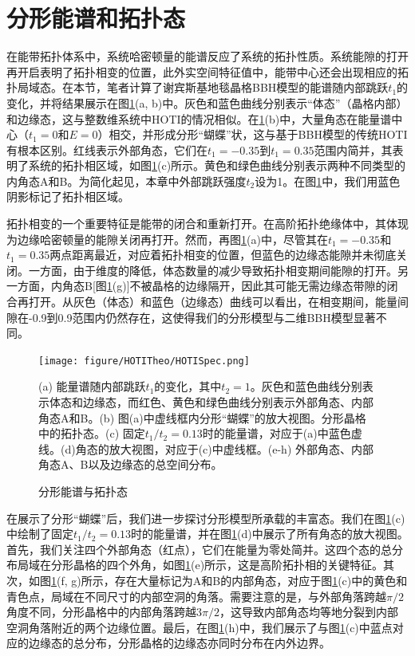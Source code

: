 \section{分形能谱和拓扑态}
在能带拓扑体系中，系统哈密顿量的能谱反应了系统的拓扑性质。系统能隙的打开再开启表明了拓扑相变的位置，此外实空间特征值中，能带中心还会出现相应的拓扑局域态。在本节，笔者计算了谢宾斯基地毯晶格BBH模型的能谱随内部跳跃$t_1$的变化，并将结果展示在图\ref{fig:HOTISpec}(a, b)中。灰色和蓝色曲线分别表示“体态”（晶格内部）和边缘态，这与整数维系统中HOTI的情况相似。在\ref{fig:HOTISpec}(b)中，大量角态在能量谱中心（$t_1=0$和$E=0$）相交，并形成分形“蝴蝶”状，这与基于BBH模型的传统HOTI有根本区别。红线表示外部角态，它们在$t_1=-0.35$到$t_1=0.35$范围内简并，其表明了系统的拓扑相区域，如图\ref{fig:HOTISpec}(c)所示。黄色和绿色曲线分别表示两种不同类型的内角态A和B。为简化起见，本章中外部跳跃强度$t_2$设为1。在图\ref{fig:HOTISpec}中，我们用蓝色阴影标记了拓扑相区域。

拓扑相变的一个重要特征是能带的闭合和重新打开。在高阶拓扑绝缘体中，其体现为边缘哈密顿量的能隙关闭再打开。然而，再图\ref{fig:HOTISpec}(a)中，尽管其在$t_1=-0.35$和$t_1=0.35$两点距离最近，对应着拓扑相变的位置，但蓝色的边缘态能隙并未彻底关闭。一方面，由于维度的降低，体态数量的减少导致拓扑相变期间能隙的打开。另一方面，内角态B[图\ref{fig:HOTISpec}(g)]不被晶格的边缘隔开，因此其可能无需边缘态带隙的闭合再打开。从灰色（体态）和蓝色（边缘态）曲线可以看出，在相变期间，能量间隙在-0.9到0.9范围内仍然存在，这使得我们的分形模型与二维BBH模型显著不同。

\begin{figure}[htbp]
    \centering
    \texttt{[image: figure/HOTITheo/HOTISpec.png]}
    \caption{分形能谱与拓扑态}(a) 能量谱随内部跳跃$t_1$的变化，其中$t_2=1$。灰色和蓝色曲线分别表示体态和边缘态，而红色、黄色和绿色曲线分别表示外部角态、内部角态A和B。(b) 图(a)中虚线框内分形“蝴蝶”的放大视图。分形晶格中的拓扑态。(c) 固定$t_1/t_2=0.13$时的能量谱，对应于(a)中蓝色虚线。(d)角态的放大视图，对应于(c)中虚线框。(e-h) 外部角态、内部角态A、B以及边缘态的总空间分布。
    \label{fig:HOTISpec}
\end{figure}

在展示了分形“蝴蝶”后，我们进一步探讨分形模型所承载的丰富态。我们在图\ref{fig:HOTISpec}(c)中绘制了固定$t_1/t_2=0.13$时的能量谱，并在图\ref{fig:HOTISpec}(d)中展示了所有角态的放大视图。首先，我们关注四个外部角态（红点），它们在能量为零处简并。这四个态的总分布局域在分形晶格的四个外角，如图\ref{fig:HOTISpec}(e)所示，这是高阶拓扑相的关键特征。其次，如图\ref{fig:HOTISpec}(f, g)所示，存在大量标记为A和B的内部角态，对应于图\ref{fig:HOTISpec}(c)中的黄色和青色点，局域在不同尺寸的内部空洞的角落。需要注意的是，与外部角落跨越$\pi/2$角度不同，分形晶格中的内部角落跨越$3\pi/2$，这导致内部角态均等地分裂到内部空洞角落附近的两个边缘位置。最后，在图\ref{fig:HOTISpec}(h)中，我们展示了与图\ref{fig:HOTISpec}(c)中蓝点对应的边缘态的总分布，分形晶格的边缘态亦同时分布在内外边界。

